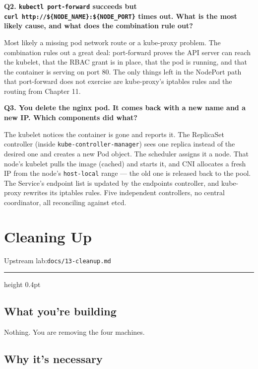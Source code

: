 \documentclass[11pt,oneside]{report}
\newcommand{\upstreamlab}[1]{%
  {\sffamily\footnotesize\color{steel}Upstream lab:\quad\texttt{#1}}\par\vspace{2pt}%
  {\color{rule}\hrule height 0.4pt}\vspace{8pt}}
\begin{document}
\textbf{Q2.
\texttt{kubectl\ port-}\allowbreak{}\texttt{forward}
succeeds but
\texttt{curl\ http:}\allowbreak{}\texttt{/}\allowbreak{}\texttt{/}\allowbreak{}\texttt{\$\{NODE\_NAME\}:}\allowbreak{}\texttt{\$\{NODE\_PORT\}}
times out. What is
the most likely
cause, and what does
the combination rule
out?}

Most likely a
missing pod network
route or a
kube-proxy problem.
The combination
rules out a great
deal: port-forward
proves the API
server can reach the
kubelet, that the
RBAC grant is in
place, that the pod
is running, and that
the container is
serving on port 80.
The only things left
in the NodePort path
that port-forward
does not exercise
are kube-proxy's
iptables rules and
the routing from
Chapter 11.

\textbf{Q3. You
delete the nginx
pod. It comes back
with a new name and
a new IP. Which
components did
what?}

The kubelet notices
the container is
gone and reports it.
The ReplicaSet
controller (inside
\texttt{kube-}\allowbreak{}\texttt{controller-}\allowbreak{}\texttt{manager})
sees one replica
instead of the
desired one and
creates a new Pod
object. The
scheduler assigns it
a node. That node's
kubelet pulls the
image (cached) and
starts it, and CNI
allocates a fresh IP
from the node's
\texttt{host-local}
range --- the old
one is released back
to the pool. The
Service's endpoint
list is updated by
the endpoints
controller, and
kube-proxy rewrites
its iptables rules.
Five independent
controllers, no
central coordinator,
all reconciling
against etcd.

\hypertarget{chap-13}{%
\chapter{Cleaning
Up}\label{chap-13}}

\upstreamlab{docs/13-cleanup.md}

\hypertarget{what-youre-building-13}{%
\section{What you're
building}\label{what-youre-building-13}}

Nothing. You are
removing the four
machines.

\hypertarget{why-its-necessary-13}{%
\section{Why it's
necessary}\label{why-its-necessary-13}}
\end{document}
